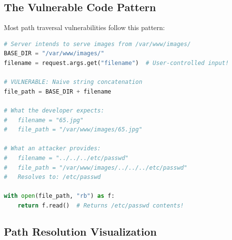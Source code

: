 \documentclass[11pt,letterpaper]{article}
\begin{document}
\subsection{The Vulnerable Code Pattern}

Most path traversal vulnerabilities follow this pattern:

\begin{lstlisting}[language=python,caption={Vulnerable Python code pattern}]
# Server intends to serve images from /var/www/images/
BASE_DIR = "/var/www/images/"
filename = request.args.get("filename")  # User-controlled input!

# VULNERABLE: Naive string concatenation
file_path = BASE_DIR + filename

# What the developer expects:
#   filename = "65.jpg"
#   file_path = "/var/www/images/65.jpg"

# What an attacker provides:
#   filename = "../../../etc/passwd"
#   file_path = "/var/www/images/../../../etc/passwd"
#   Resolves to: /etc/passwd

with open(file_path, "rb") as f:
    return f.read()  # Returns /etc/passwd contents!
\end{lstlisting}

\subsection{Path Resolution Visualization}
\end{document}
